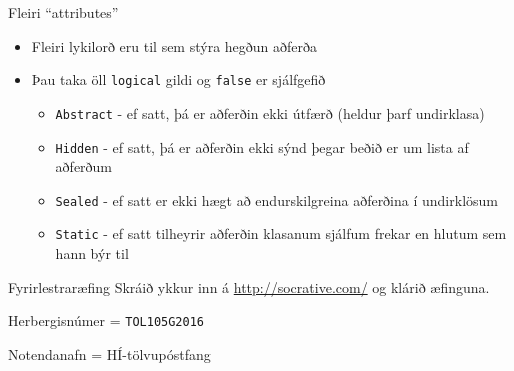 \documentclass{beamer}
\begin{document}
\begin{frame}{Fleiri ``attributes''}
\begin{itemize}
 \item Fleiri lykilorð eru til sem stýra hegðun aðferða
 \item Þau taka öll \texttt{logical} gildi og \texttt{false} er sjálfgefið
 \begin{itemize}
  \item \texttt{Abstract} - ef satt, þá er aðferðin ekki útfærð (heldur þarf undirklasa)
  \item \texttt{Hidden} - ef satt, þá er aðferðin ekki sýnd þegar beðið er um lista af aðferðum
  \item \texttt{Sealed} - ef satt er ekki hægt að endurskilgreina aðferðina í undirklösum
  \item \texttt{Static} - ef satt tilheyrir aðferðin klasanum sjálfum frekar en hlutum sem hann býr til
 \end{itemize}

\end{itemize}

\end{frame}


\begin{frame}[fragile]{Fyrirlestraræfing}
Skráið ykkur inn á \url{http://socrative.com/} og klárið æfinguna.

Herbergisnúmer = \texttt{TOL105G2016}

Notendanafn = HÍ-tölvupóstfang
\end{frame}
\end{document}
